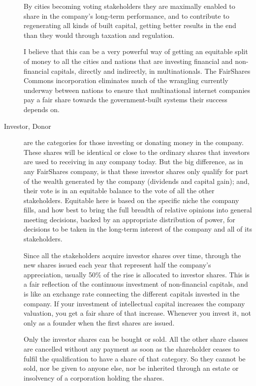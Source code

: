 \begin{description}
By cities becoming voting stakeholders they are maximally enabled to share in the company’s long-term performance, and to contribute to regenerating all kinds of built capital, getting better results in the end than they would through taxation and regulation.


I believe that this can be a very powerful way of getting an equitable split of money to all the cities and nations that are investing financial and non-financial capitals, directly and indirectly, in multinationals. The FairShares Commons incorporation eliminates much of the wrangling currently underway between nations to ensure that multinational internet companies pay a fair share towards the government-built systems their success depends on.


\item[Investor, Donor] are the categories for those investing or donating money in the company. These shares will be identical or close to the ordinary shares that investors are used to receiving in any company today. But the big difference, as in any FairShares company, is that these investor shares only qualify for part of the wealth generated by the company (dividends and capital gain); and, their vote is in an equitable balance to the vote of all the other stakeholders. Equitable here is based on the specific niche the company fills, and how best to bring the full breadth of relative opinions into general meeting decisions, backed by an appropriate distribution of power, for decisions to be taken in the long-term interest of the company and all of its stakeholders. 


Since all the stakeholders acquire investor shares over time, through the new shares issued each year that represent half the company’s appreciation, usually 50\% of the rise is allocated to investor shares. This is a fair reflection of the continuous investment of non-financial capitals, and is like an exchange rate connecting the different capitals invested in the company. If your investment of intellectual capital increases the company valuation, you get a fair share of that increase. Whenever you invest it, not only as a founder when the first shares are issued. 


Only the investor shares can be bought or sold. All the other share classes are cancelled without any payment as soon as the shareholder ceases to fulfil the qualification to have a share of that category. So they cannot be sold, nor be given to anyone else, nor be inherited through an estate or insolvency of a corporation holding the shares. 



\end{description}
